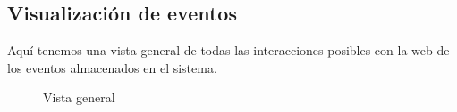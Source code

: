 \begin{minipage}{\linewidth}
\subsection{Visualización de eventos}
Aquí tenemos una vista general de todas las interacciones posibles con la web de los eventos almacenados en el sistema.
\begin{figure}[H]
\caption{Vista general}
\end{figure}
\end{minipage}
